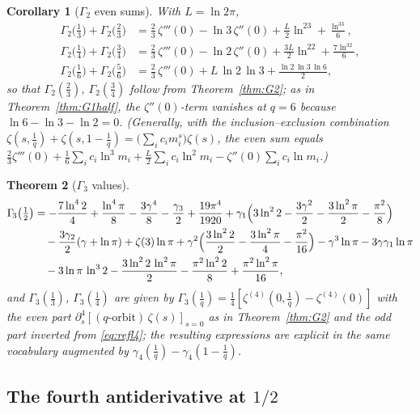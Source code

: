 \documentclass[11pt]{article}
\newtheorem{theorem}{Theorem}[section]
\newtheorem{corollary}[theorem]{Corollary}
\theoremstyle{remark}
\begin{document}
\begin{corollary}[$\Gamma_{\!2}$ even sums]\label{cor:G2even}
With $L=\ln2\pi$,
\begin{align*}
\Gamma_{\!2}\bigl(\tfrac13\bigr)+\Gamma_{\!2}\bigl(\tfrac23\bigr)
&=\tfrac23\,\zeta'''(0)-\ln3\,\zeta''(0)+\tfrac{L}{2}\ln^23+\tfrac{\ln^33}{6},\\
\Gamma_{\!2}\bigl(\tfrac14\bigr)+\Gamma_{\!2}\bigl(\tfrac34\bigr)
&=\tfrac23\,\zeta'''(0)-\ln2\,\zeta''(0)+\tfrac{3L}{2}\ln^22+\tfrac{7\ln^32}{6},\\
\Gamma_{\!2}\bigl(\tfrac16\bigr)+\Gamma_{\!2}\bigl(\tfrac56\bigr)
&=\tfrac23\,\zeta'''(0)+L\,\ln2\,\ln3+\tfrac{\ln2\,\ln3\,\ln6}{2},
\end{align*}
so that $\Gamma_{\!2}(\tfrac23)$, $\Gamma_{\!2}(\tfrac34)$ follow from
Theorem~\ref{thm:G2}; as in Theorem~\ref{thm:G1half}, the $\zeta''(0)$-term
vanishes at $q=6$ because $\ln6-\ln3-\ln2=0$. (Generally, with the
inclusion--exclusion combination
$\zeta(s,\tfrac1q)+\zeta(s,1-\tfrac1q)=\bigl(\sum_ic_im_i^s\bigr)\zeta(s)$,
the even sum equals $\tfrac23\zeta'''(0)+\tfrac16\sum_ic_i\ln^3m_i
+\tfrac{L}{2}\sum_ic_i\ln^2m_i-\zeta''(0)\sum_ic_i\ln m_i$.)
\end{corollary}

\begin{theorem}[$\Gamma_{\!3}$ values]\label{thm:G3}
\begin{align*}
\Gamma_{\!3}\bigl(\tfrac12\bigr)
&=-\frac{7\ln^4 2}{4}+\frac{\ln^4\pi}{8}-\frac{3\gamma^4}{8}
-\frac{\gamma_3}{2}+\frac{19\pi^4}{1920}
+\gamma_1\Bigl(3\ln^2 2-\frac{3\gamma^2}{2}-\frac{3\ln^2\pi}{2}-\frac{\pi^2}{8}\Bigr)\\
&\quad-\frac{3\gamma_2}{2}(\gamma+\ln\pi)
+\zeta(3)\ln\pi
+\gamma^2\Bigl(\frac{3\ln^2 2}{2}-\frac{3\ln^2\pi}{4}-\frac{\pi^2}{16}\Bigr)
-\gamma^3\ln\pi-3\gamma\gamma_1\ln\pi\\
&\quad-3\ln\pi\,\ln^3 2-\frac{3\ln^2 2\,\ln^2\pi}{2}
-\frac{\pi^2\ln^2 2}{8}+\frac{\pi^2\ln^2\pi}{16},
\end{align*}
and $\Gamma_{\!3}(\tfrac13)$, $\Gamma_{\!3}(\tfrac14)$ are given by
$\Gamma_{\!3}(\tfrac1q)=\tfrac14[\zeta^{(4)}(0,\tfrac1q)-\zeta^{(4)}(0)]$ with
the even part $\partial_s^4[(q\text{-orbit})\,\zeta(s)]_{s=0}$ as in
Theorem~\ref{thm:G2} and the odd part inverted from \eqref{eq:refl4}; the
resulting expressions are explicit in the same vocabulary augmented by
$\gamma_4(\tfrac1q)-\gamma_4(1-\tfrac1q)$.
\end{theorem}

\subsection{The fourth antiderivative at \texorpdfstring{$1/2$}{1/2}}
\end{document}
